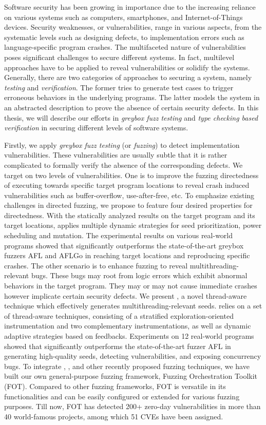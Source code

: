 Software security has been growing in importance due to the increasing reliance on various systems such as computers, smartphones, and Internet-of-Things devices. Security weaknesses, or vulnerabilities, range in various aspects, from the systematic levels such as designing defects, to implementation errors such as language-specific program crashes. The multifaceted nature of vulnerabilities poses significant challenges to secure different systems. In fact, multilevel approaches have to be applied to reveal vulnerabilities or solidify the systems. Generally, there are two categories of approaches to securing a system, namely \emph{testing} and \emph{verification}. The former tries to generate test cases to trigger erroneous behaviors in the underlying programs. The latter models the system in an abstracted description to prove the absence of certain security defects.
  In this thesis, we will describe our efforts in \emph{greybox fuzz testing} and \emph{type checking based verification} in securing different levels of software systems.

Firstly, we apply \emph{greybox fuzz testing} (or \emph{fuzzing}) to detect implementation vulnerabilities. These vulnerabilities are usually subtle that it is rather complicated to formally verify the absence of the corresponding defects. We target on two levels of vulnerabilities.
One is to improve the fuzzing directedness of executing towards specific target program locations to reveal crash induced vulnerabilities such as buffer-overflow, use-after-free, etc. To emphasize existing challenges in \mbox{directed} fuzzing, we propose \dFOT to feature four desired properties for directedness. With the statically analyzed results on the target program and its target locations, \dFOT applies multiple dynamic strategies for seed prioritization, power scheduling and \mbox{mutation}. The experimental results on various real-world \mbox{programs} showed that \dFOT significantly outperforms the state-of-the-art greybox fuzzers AFL and AFLGo in reaching target locations and reproducing specific crashes.
The other scenario is to enhance fuzzing to reveal multithreading-relevant bugs. These bugs may root from logic errors which exhibit abnormal behaviors in the target program. They may or may not cause immediate crashes however implicate certain security defects. We present \mtfuzz, a novel thread-aware technique which effectively generates multithreading-relevant seeds. \mtfuzz relies on a set of thread-aware techniques, consisting of a stratified exploration-oriented instrumentation and two complementary instrumentations, as well as dynamic adaptive strategies based on feedbacks. Experiments on 12 real-world programs showed that \mtfuzz significantly outperforms the state-of-the-art fuzzer AFL in generating high-quality seeds, detecting vulnerabilities, and exposing concurrency bugs.
To integrate \dFOT, \mtfuzz, and other recently proposed fuzzing techniques, we have built our own general-purpose fuzzing framework, Fuzzing Orchestration Toolkit (FOT). Compared to other fuzzing frameworks, FOT is versatile in its functionalities and can be easily configured or extended for various fuzzing purposes. Till now, FOT has detected 200+ zero-day vulnerabilities in more than 40 world-famous projects, among which 51 CVEs have been assigned.

